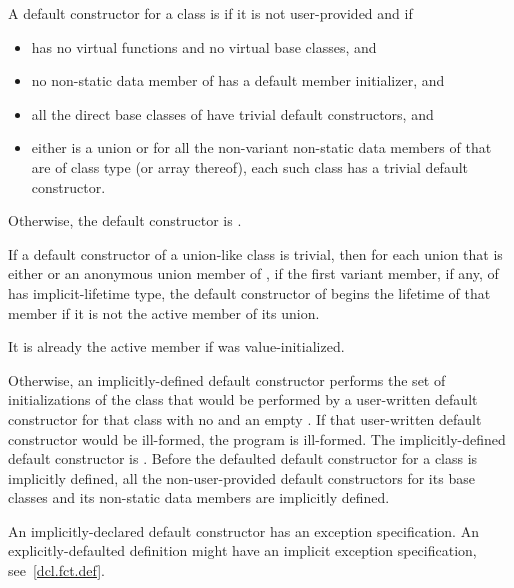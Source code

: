 \pnum
A default constructor for a class  is
if it is not user-provided and if
\begin{itemize}
\item
{} has no virtual functions and no virtual base
classes, and

\item no non-static data member of  has
a default member initializer, and

\item
all the direct base classes of  have trivial default constructors, and

\item
either  is a union or
for all the non-variant non-static data members of  that are of class
type (or array thereof), each such class has a trivial default constructor.
\end{itemize}

Otherwise, the default constructor is
.

\pnum
If a default constructor of a union-like class  is trivial,
then for each union 
that is either  or an anonymous union member of ,
if the first variant member, if any, of 
has implicit-lifetime type,
the default constructor of  begins the lifetime of that member
if it is not the active member of its union.
\begin{note}
It is already the active member if  was value-initialized.
\end{note}
Otherwise,
an implicitly-defined default constructor performs the set of
initializations of the class that would be performed by a user-written default
constructor for that class with no
 and an empty
.
If that user-written default constructor would be ill-formed,
the program is ill-formed.
The implicitly-defined
default constructor is .
Before the defaulted default constructor for a class is
implicitly defined,
all the non-user-provided default constructors for its base classes and
its non-static data members are implicitly defined.
\begin{note}
An implicitly-declared default constructor has an
exception specification.
An explicitly-defaulted definition might have an
implicit exception specification, see~\ref{dcl.fct.def}.
\end{note}

